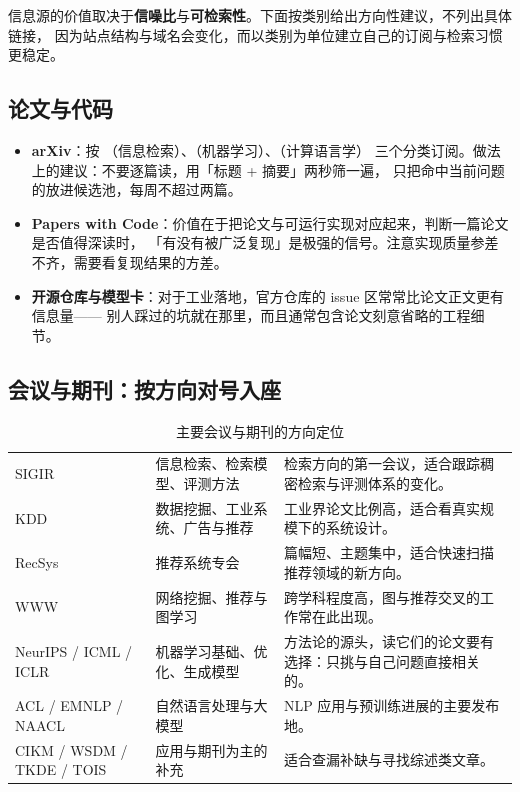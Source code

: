 信息源的价值取决于\textbf{信噪比}与\textbf{可检索性}。下面按类别给出方向性建议，不列出具体链接，
因为站点结构与域名会变化，而以类别为单位建立自己的订阅与检索习惯更稳定。

\subsection{论文与代码}

\begin{itemize}
  \item \textbf{arXiv}：按 （信息检索）、（机器学习）、（计算语言学）
        三个分类订阅。做法上的建议：不要逐篇读，用「标题 + 摘要」两秒筛一遍，
        只把命中当前问题的放进候选池，每周不超过两篇。
  \item \textbf{Papers with Code}：价值在于把论文与可运行实现对应起来，判断一篇论文是否值得深读时，
        「有没有被广泛复现」是极强的信号。注意实现质量参差不齐，需要看复现结果的方差。
  \item \textbf{开源仓库与模型卡}：对于工业落地，官方仓库的 issue 区常常比论文正文更有信息量——
        别人踩过的坑就在那里，而且通常包含论文刻意省略的工程细节。
\end{itemize}

\subsection{会议与期刊：按方向对号入座}

\begin{table}[htbp]
\centering
\caption{主要会议与期刊的方向定位}
\label{tab:venues}
\small
\begin{tabularx}{\textwidth}{L{1.9cm} L{3.0cm} Y}
\toprule
{} &  &  \\
\midrule
SIGIR & 信息检索、检索模型、评测方法 &
检索方向的第一会议，适合跟踪稠密检索与评测体系的变化。 \\
\midrule
KDD & 数据挖掘、工业系统、广告与推荐 &
工业界论文比例高，适合看真实规模下的系统设计。 \\
\midrule
RecSys & 推荐系统专会 &
篇幅短、主题集中，适合快速扫描推荐领域的新方向。 \\
\midrule
WWW & 网络挖掘、推荐与图学习 &
跨学科程度高，图与推荐交叉的工作常在此出现。 \\
\midrule
NeurIPS / ICML / ICLR & 机器学习基础、优化、生成模型 &
方法论的源头，读它们的论文要有选择：只挑与自己问题直接相关的。 \\
\midrule
ACL / EMNLP / NAACL & 自然语言处理与大模型 &
NLP 应用与预训练进展的主要发布地。 \\
\midrule
CIKM / WSDM / TKDE / TOIS & 应用与期刊为主的补充 &
适合查漏补缺与寻找综述类文章。 \\
\bottomrule
\end{tabularx}
\end{table}

